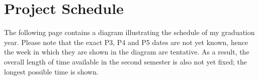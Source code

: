 
\section{Project Schedule}
\label{sec:pd}

The following page contains a diagram illustrating the schedule of my graduation year. Please note that the exact P3, P4 and P5 dates are not yet known, hence the week in which they are shown in the diagram are tentative. As a result, the overall length of time available in the second semester is also not yet fixed; the longest possible time is shown.

